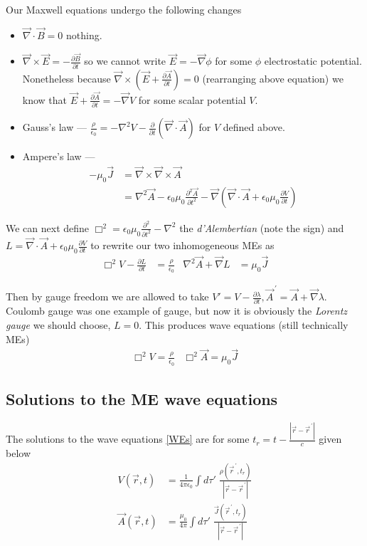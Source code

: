 \documentclass[10pt,twocolumn]{article}
\newcommand{\pd}[2]{\frac{\partial#1}{\partial#2}}
\newcommand{\ptd}[2]{\frac{\partial^2 #1}{\partial#2^2}}
\newcommand{\abs}[1]{\left|#1\right|}
\newcommand{\pvec}[1]{\vec{#1}^{\,\prime}}
\begin{document}
Our Maxwell equations undergo the following changes
\begin{itemize}
    \item $\vec{\nabla} \cdot \vec{B} = 0$ nothing.
    \item $\vec{\nabla} \times \vec{E} = -\pd{\vec{B}}{t}$ so we cannot write $\vec{E} = -\vec{\nabla} \phi$ for some $\phi$ electrostatic potential. Nonetheless because $\vec{\nabla} \times \left( \vec{E} + \pd{\vec{A}}{t} \right) = 0$ (rearranging above equation) we know that $\vec{E} + \pd{\vec{A}}{t} = -\vec{\nabla}V$ for some scalar potential $V$.
    \item Gauss's law --- $\frac{\rho}{\epsilon_0} = -\nabla^2 V - \pd{}{t}\left( \vec{\nabla} \cdot \vec{A} \right)$ for $V$ defined above.
    \item Ampere's law --- 
        \begin{align}
            -\mu_0 \vec{J} &= \vec{\nabla} \times \vec{\nabla} \times \vec{A}\\
            &= \nabla^2 \vec{A} - \epsilon_0 \mu_0 \ptd{\vec{A}}{t} - \vec{\nabla}\left( \vec{\nabla} \cdot \vec{A} + \epsilon_0 \mu_0 \pd{V}{t} \right)
        \end{align}
\end{itemize}

We can next define $\Box^2 = \epsilon_0 \mu_0 \ptd{}{t} - \nabla^2$ the \emph{d'Alembertian} (note the sign) and $L = \vec{\nabla} \cdot \vec{A} + \epsilon_0 \mu_0 \pd{V}{t}$ to rewrite our two inhomogeneous MEs as
\begin{align}
    \Box^2V - \pd{L}{t} &= \frac{\rho}{\epsilon_0} & \nabla^2 \vec{A} + \vec{\nabla}L &= \mu_0 \vec{J}
\end{align}

Then by gauge freedom we are allowed to take $V' = V - \pd{\lambda}{t}, \pvec{A} = \vec{A} + \vec{\nabla}\lambda$. Coulomb gauge was one example of gauge, but now it is obviously the \emph{Lorentz gauge} we should choose, $L=0$. This produces wave equations (still technically MEs)
\begin{align}
    \Box^2 V = \frac{\rho}{\epsilon_0} & \Box^2 \vec{A} = \mu_0 \vec{J}\label{WEs}
\end{align}

\subsection{Solutions to the ME wave equations}

The solutions to the wave equations \eqref{WEs} are for some $t_r = t - \frac{\abs{\vec{r} - \pvec{r}}}{c}$ given below
\begin{align}
    V(\vec{r},t) &= \frac{1}{4\pi\epsilon_0}\int d\tau'\; \frac{\rho(\pvec{r},t_r)}{\abs{\vec{r} - \pvec{r}}} \\
    \vec{A}(\vec{r},t) &= \frac{\mu_0}{4\pi}\int d\tau'\; \frac{\vec{J}(\pvec{r},t_r)}{\abs{\vec{r} - \pvec{r}}}
\end{align}
\end{document}
